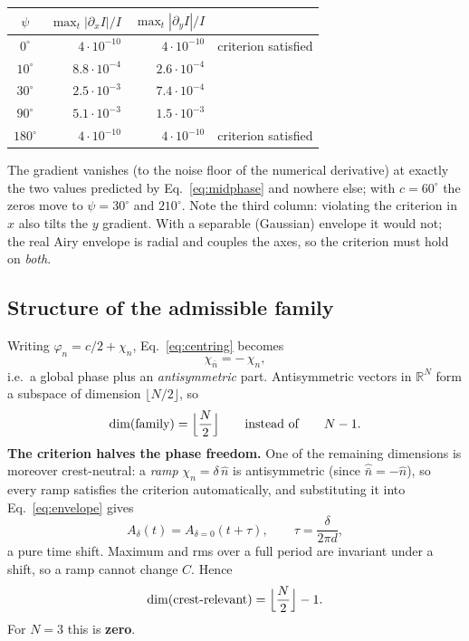 \documentclass[11pt,a4paper]{article}
\newcommand{\crest}{\ensuremath{C}}
\begin{document}
\begin{center}
\begin{tabular}{crrl}
  \toprule
  $\psi$ & $\max_t|\partial_x I|/I$ & $\max_t|\partial_y I|/I$ & \\
  \midrule
  $0^\circ$   & $4\cdot10^{-10}$ & $4\cdot10^{-10}$ & criterion satisfied\\
  $10^\circ$  & $8.8\cdot10^{-4}$ & $2.6\cdot10^{-4}$ & \\
  $30^\circ$  & $2.5\cdot10^{-3}$ & $7.4\cdot10^{-4}$ & \\
  $90^\circ$  & $5.1\cdot10^{-3}$ & $1.5\cdot10^{-3}$ & \\
  $180^\circ$ & $4\cdot10^{-10}$ & $4\cdot10^{-10}$ & criterion satisfied\\
  \bottomrule
\end{tabular}
\end{center}

\noindent The gradient vanishes (to the noise floor of the numerical
derivative) at exactly the two values predicted by
Eq.~\eqref{eq:midphase} and nowhere else; with $c = 60^\circ$ the zeros move
to $\psi = 30^\circ$ and $210^\circ$. Note the third column: violating the
criterion in $x$ also tilts the $y$ gradient. With a separable (Gaussian)
envelope it would not; the real Airy envelope is radial and couples the axes,
so the criterion must hold on \emph{both}.

\subsection{Structure of the admissible family}

Writing $\varphi_n = c/2 + \chi_n$, Eq.~\eqref{eq:centring} becomes
\begin{equation}
  \chi_{\bar n} = -\,\chi_n ,
  \label{eq:antisym}
\end{equation}
i.e.\ a global phase plus an \emph{antisymmetric} part. Antisymmetric vectors
in $\mathbb{R}^N$ form a subspace of dimension $\lfloor N/2\rfloor$, so
\begin{equation}
  \dim(\text{family}) = \Bigl\lfloor \frac{N}{2} \Bigr\rfloor
  \qquad\text{instead of}\qquad N-1 .
\end{equation}
\textbf{The criterion halves the phase freedom.} One of the remaining
dimensions is moreover crest-neutral: a \emph{ramp}
$\chi_n = \delta\,\hat n$ is antisymmetric (since
$\hat{\bar n} = -\hat n$), so every ramp satisfies the criterion
automatically, and substituting it into Eq.~\eqref{eq:envelope} gives
\begin{equation}
  A_\delta(t) = A_{\delta=0}(t+\tau) , \qquad \tau = \frac{\delta}{2\pi d} ,
  \label{eq:rampshift}
\end{equation}
a pure time shift. Maximum and rms over a full period are invariant under a
shift, so a ramp cannot change \crest. Hence
\begin{equation}
  \dim(\text{crest-relevant}) = \Bigl\lfloor \frac{N}{2} \Bigr\rfloor - 1 .
  \label{eq:dimcrest}
\end{equation}
For $N=3$ this is \textbf{zero}.
\end{document}
